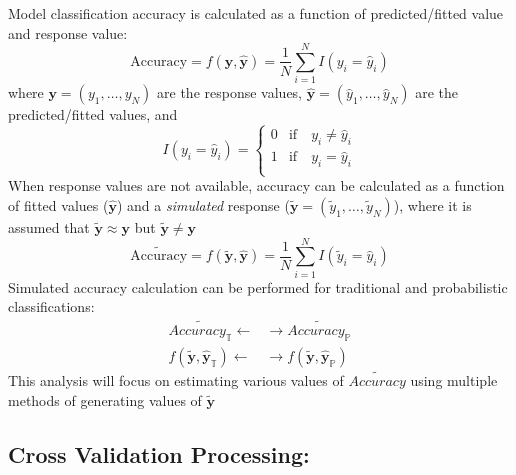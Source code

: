 \documentclass[12pt,]{article}
\begin{document}
Model classification accuracy is calculated as a function of
predicted/fitted value and response value:
\[\text{Accuracy} = f(\mathbf{y}, \mathbf{\hat{y}}) = \frac{1}{N} \sum_{i=1}^{N}  I\left(y_{i}=\hat{y}_{i} \right)\]
where \(\mathbf{y}=\left(y_{1}, \ldots, y_{N}\right)\) are the response
values,
\(\mathbf{\hat{y}}=\left(\hat{y}_{1},\ldots, \hat{y}_{N} \right)\) are
the predicted/fitted values, and\\
\[
I\left(y_{i}=\hat{y}_{i} \right)=
\begin{cases} 
0 &\mbox{if} \quad  y_{i} \neq \hat{y}_{i} \\ 
1 &\mbox{if} \quad  y_{i} = \hat{y}_{i} \\ 
\end{cases}
\] When response values are not available, accuracy can be calculated as
a function of fitted values (\(\mathbf{\hat{y}}\)) and a
\textit{simulated} response
(\(\tilde{\mathbf{y}}=\left(\tilde{y}_{1}, \ldots, \tilde{y}_{N} \right)\)),
where it is assumed that \(\mathbf{\tilde{y}}\approx\mathbf{y}\) but
\(\mathbf{\tilde{y}} \neq \mathbf{y}\) \[
\tilde{\text{Accuracy}} = f(\mathbf{\tilde{y}}, \mathbf{\hat{y}}) = \frac{1}{N} \sum_{i=1}^{N}  I\left(\tilde{y}_{i}=\hat{y}_{i} \right) \tag{EQ: 2.1-1} \label{EQ: 2.1-1}
\] Simulated accuracy calculation can be performed for traditional and
probabilistic classifications: \begin{align*}
\tilde{Accuracy_{\mathbb{T}}} \leftarrow & \rightarrow \tilde{Accuracy_{\mathbb{P}}} \\[0.5em]
f\left(\mathbf{\tilde{y}}, \mathbf{\hat{y}}_{\mathbb{T}} \right) \leftarrow & \rightarrow f\left(\mathbf{\tilde{y}}, \mathbf{\hat{y}}_{\mathbb{P}} \right) \tag{EQ: 2.1-2} \label{2.1-2}
\end{align*} This analysis will focus on estimating various values of
\(\tilde{Accuracy}\) using multiple methods of generating values of
\(\tilde{\mathbf{y}}\)

\hypertarget{cross-validation-processing}{%
\subsection{Cross Validation
Processing:}\label{cross-validation-processing}}
\end{document}
